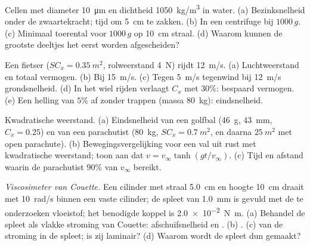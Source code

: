 \begin{exercise}[$\star\star$]\label{exo:b2:viscous-flows:6}
Cellen met diameter \qty{10}{\micro m} en dichtheid \qty{1050}{kg/m^3} in
water. (a) Bezinksnelheid onder de zwaartekracht; tijd om \qty{5}{cm} te
zakken. (b) In een centrifuge bij $1000\,g$. (c) Minimaal toerental voor
$1000\,g$ op \qty{10}{cm} straal. (d) Waarom kunnen de grootste deeltjes het
eerst worden afgescheiden?
\end{exercise}

\begin{exercise}[$\star\star$]\label{exo:b2:viscous-flows:7}
Een fietser ($SC_x = \qty{0.35}{m^2}$, rolweerstand \qty{4}{N}) rijdt
\qty{12}{m/s}. (a) Luchtweerstand en totaal vermogen. (b) Bij \qty{15}{m/s}.
(c) Tegen \qty{5}{m/s} tegenwind bij \qty{12}{m/s} grondsnelheid. (d) In het
wiel rijden verlaagt $C_x$ met $30\%$: bespaard vermogen. (e) Een helling
van $5\%$ af zonder trappen (massa \qty{80}{kg}): eindsnelheid.
\end{exercise}

\begin{exercise}[$\star\star$]\label{exo:b2:viscous-flows:8}
Kwadratische weerstand. (a) Eindsnelheid van een golfbal (\qty{46}{g},
\qty{43}{mm}, $C_x = 0.25$) en van een parachutist (\qty{80}{kg},
$SC_x = \qty{0.7}{m^2}$, en daarna $\qty{25}{m^2}$ met open parachute). (b)
Bewegingsvergelijking voor een val uit rust met kwadratische weerstand; toon
aan dat $v = v_\infty\tanh(gt/v_\infty)$. (c) Tijd en afstand waarin de
parachutist $90\%$ van $v_\infty$ bereikt.
\end{exercise}

\begin{exercise}[$\star\star$]\label{exo:b2:viscous-flows:9}
\emph{Viscosimeter van Couette.} Een cilinder met straal \qty{5.0}{cm} en
hoogte \qty{10}{cm} draait met \qty{10}{rad/s} binnen een vaste cilinder; de
spleet van \qty{1.0}{mm} is gevuld met de te onderzoeken vloeistof; het
benodigde koppel is \qty{2.0e-2}{N.m}. (a) Behandel de spleet als vlakke
stroming van Couette: afschuifsnelheid en . (b) .
(c)  van de stroming in de spleet; is zij laminair? (d) Waarom
wordt de spleet dun gemaakt?
\end{exercise}

